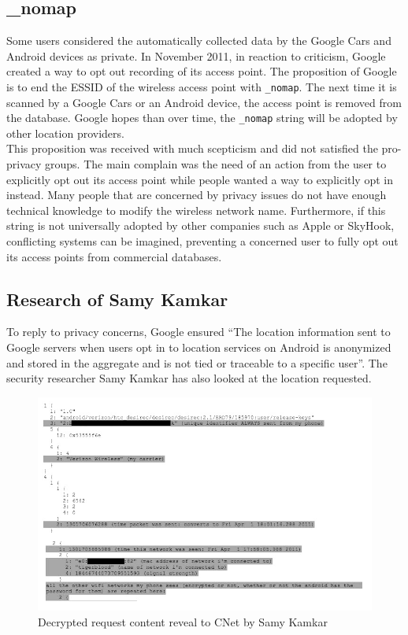 \subsection{\_nomap}

Some users considered the automatically collected data by the Google Cars and Android devices as private.
In November 2011, in reaction to criticism, Google created a way to opt out recording of its access point.
The proposition of Google is to end the ESSID of the wireless access point with \texttt{\_nomap}.
The next time it is scanned by a Google Cars or an Android device, the access point is removed from the database.
Google hopes than over time, the \texttt{\_nomap} string will be adopted by other location providers\cite{nomap}.\\

This proposition was received with much scepticism and did not satisfied the pro-privacy groups.
The main complain was the need of an action from the user to explicitly opt out its access point while people wanted a way to explicitly opt in instead.
Many people that are concerned by privacy issues do not have enough technical knowledge to modify the wireless network name.
Furthermore, if this string is not universally adopted by other companies such as Apple or SkyHook, conflicting systems can be imagined, preventing a concerned user to fully opt out its access points from commercial databases.

\subsection{Research of Samy Kamkar}

To reply to privacy concerns, Google ensured ``The location information sent to Google servers when users opt in to location services on Android is anonymized and stored in the aggregate and is not tied or traceable to a specific user''\cite{loc-not-traceable}.
The security researcher Samy Kamkar has also looked at the location requested.\\

\begin{figure}[h]
  \hspace*{-2cm}
  \centering
  \includegraphics[width=18cm]{images/reqdecode.jpg}
  \caption{Decrypted request content reveal to CNet by Samy Kamkar}
  \label{fig:reqdecode}
\end{figure}

